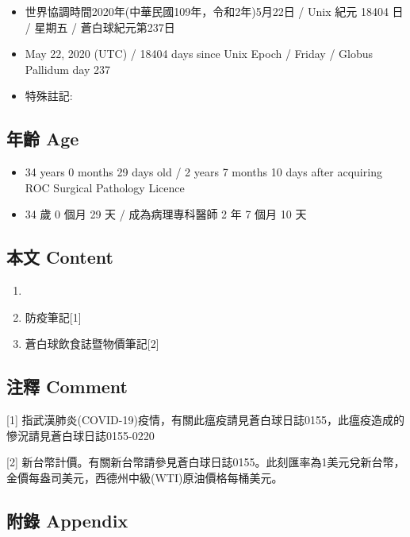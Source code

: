 \documentclass[
]{article}
\providecommand{\tightlist}{%
  \setlength{\itemsep}{0pt}\setlength{\parskip}{0pt}}
\begin{document}
\begin{itemize}
\tightlist
\item
  世界協調時間2020年(中華民國109年，令和2年)5月22日 / Unix 紀元 18404 日
  / 星期五 / 蒼白球紀元第237日
\item
  May 22, 2020 (UTC) / 18404 days since Unix Epoch / Friday / Globus
  Pallidum day 237
\item
  特殊註記:
\end{itemize}

\hypertarget{ux5e74ux9f61-age-21}{%
\subsection{年齡 Age}\label{ux5e74ux9f61-age-21}}

\begin{itemize}
\tightlist
\item
  34 years 0 months 29 days old / 2 years 7 months 10 days after
  acquiring ROC Surgical Pathology Licence
\item
  34 歲 0 個月 29 天 / 成為病理專科醫師 2 年 7 個月 10 天
\end{itemize}

\hypertarget{ux672cux6587-content-21}{%
\subsection{本文 Content}\label{ux672cux6587-content-21}}

\begin{enumerate}
\def\labelenumi{\arabic{enumi}.}
\item
\item
  防疫筆記{[}1{]}
\item
  蒼白球飲食誌暨物價筆記{[}2{]}
\end{enumerate}

\hypertarget{ux6ce8ux91cb-comment-21}{%
\subsection{注釋 Comment}\label{ux6ce8ux91cb-comment-21}}

{[}1{]}
指武漢肺炎(COVID-19)疫情，有關此瘟疫請見蒼白球日誌0155，此瘟疫造成的慘況請見蒼白球日誌0155-0220

{[}2{]}
新台幣計價。有關新台幣請參見蒼白球日誌0155。此刻匯率為1美元兌新台幣，金價每盎司美元，西德州中級(WTI)原油價格每桶美元。

\hypertarget{ux9644ux9304-appendix-21}{%
\subsection{附錄 Appendix}\label{ux9644ux9304-appendix-21}}
\end{document}
